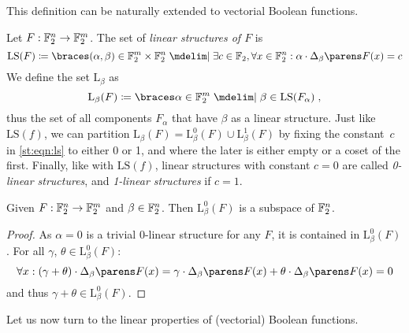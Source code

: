 This definition can be naturally extended to vectorial Boolean functions.
\begin{definition}
    Let $F : \mathbb{F}_2^n \to \mathbb{F}_2^m$.
    The set of \emph{linear structures of $F$} is
    \begin{equation}\label{st:eqn:ls}
        \mathrm{LS}(F) \coloneqq \set{(\alpha, \beta) \in \F_2^m \times \F_2^n \given \exists c \in \F_2, \forall x \in \F_2^n : \iprod{\alpha}{\derive{\beta}{F}(x)} = c}
    \end{equation}
    We define the set $\mathrm{L}_\beta$ as
    \begin{equation*}
        \mathrm{L}_\beta(F) \coloneqq \set{\alpha \in \F_2^m \given \beta \in \mathrm{LS}(F_\alpha)}\;,
    \end{equation*}
    thus the set of all components $F_\alpha$ that have $\beta$ as a linear structure.
    Just like $\mathrm{LS}(f)$, we can partition $\mathrm{L}_\beta(F) = \mathrm{L}_\beta^0(F) \cup \mathrm{L}_\beta^1(F)$ by fixing the constant~$c$ in \cref{st:eqn:ls} to either 0 or 1, and where the later is either empty or a coset of the first.
    Finally, like with $\mathrm{LS}(f)$, linear structures with constant $c = 0$ are called \emph{0-linear structures}, and \emph{1-linear structures} if $c=1$.
\end{definition}

\begin{lemma}
    Given $F : \mathbb{F}_2^n \to \mathbb{F}_2^m$ and $\beta \in \mathbb{F}_2^n$.
    Then $\mathrm{L}_\beta^0(F)$ is a subspace of $\mathbb{F}_2^n$.
\end{lemma}
\begin{proof}
      As $\alpha = 0$ is a trivial 0-linear structure for any $F$, it is contained in $\mathrm{L}_\beta^0(F)$.
      For all $\gamma$, $\theta \in \mathrm{L}_\beta^0(F)$:
      \begin{equation*}
          \forall x : \iprod{(\gamma + \theta)}{\derive{\beta}{F}(x)} = \iprod{\gamma}{\derive{\beta}{F}(x)} + \iprod{\theta}{\derive{\beta}{F}(x)} = 0
      \end{equation*}
      and thus $\gamma + \theta \in \mathrm{L}_\beta^0(F)$.
\end{proof}

Let us now turn to the linear properties of (vectorial) Boolean functions.

